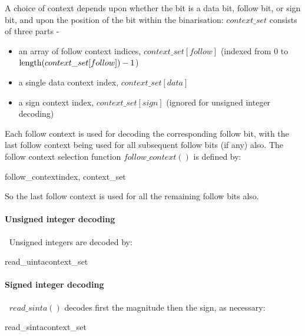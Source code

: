 A choice of context depends upon whether the bit is a data bit, follow bit, 
or sign bit, and upon the position of the bit within the binarisation: 
$context\_set$ consists of three parts -
\begin{itemize}
\item an array of follow context indices, $context\_set[follow]$ (indexed from 0 to 
$\operatorname{length}(context\_set[follow])-1$)
\item a single data context index, $context\_set[data]$ 
\item a sign context index, $context\_set[sign]$ (ignored for unsigned integer decoding)
\end{itemize}

Each follow context is used for decoding the corresponding follow bit, with the
last follow context being used for all subsequent follow bits (if any) also. 
The follow context selection function $follow\_context()$ is defined by:

\begin{pseudo}{follow\_context}{index, context\_set}
\end{pseudo}

So the last follow context is used for all the remaining follow bits also.

\paragraph{Unsigned integer decoding}
$\ $\newline
Unsigned integers are decoded by:

\begin{pseudo}{read\_uinta}{context\_set}
  \bsEND
\bsEND
{}
\end{pseudo}

\paragraph{Signed integer decoding}
$\ $\newline
$read\_sinta()$ decodes first the magnitude then the sign, as necessary:

\begin{pseudo}{read\_sinta}{context\_set}
  \bsEND
\bsEND
{}
\end{pseudo}